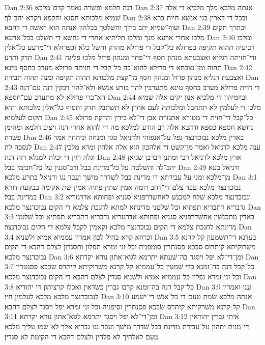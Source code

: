 Dan 2:36  דנה חלמא ופשׁרה נאמר קדם־מלכא׃
Dan 2:37  אנתה מלכא מלך מלכיא די אלה שׁמיא מלכותא חסנא ותקפא ויקרא יהב־לך׃
Dan 2:38  ובכל־די דארין בני־אנשׁא חיות ברא ועוף־שׁמיא יהב בידך והשׁלטך בכלהון אנתה הוא ראשׁה די דהבא׃
Dan 2:39  ובתרך תקום מלכו אחרי ארעא מנך ומלכו תליתיא אחרי די נחשׁא די תשׁלט בכל־ארעא׃
Dan 2:40  ומלכו רביעיה תהוא תקיפה כפרזלא כל־קבל די פרזלא מהדק וחשׁל כלא וכפרזלא די־מרעע כל־אלין תדק ותרע׃
Dan 2:41  ודי־חזיתה רגליא ואצבעתא מנהון חסף די־פחר ומנהון פרזל מלכו פליגה תהוה ומן־נצבתא די פרזלא להוא־בה כל־קבל די חזיתה פרזלא מערב בחסף טינא׃
Dan 2:42  ואצבעת רגליא מנהון פרזל ומנהון חסף מן־קצת מלכותא תהוה תקיפה ומנה תהוה תבירה׃
Dan 2:43  די חזית פרזלא מערב בחסף טינא מתערבין להון בזרע אנשׁא ולא־להון דבקין דנה עם־דנה הא־כדי פרזלא לא מתערב עם־חספא׃
Dan 2:44  וביומיהון די מלכיא אנון יקים אלה שׁמיא מלכו די לעלמין לא תתחבל ומלכותה לעם אחרן לא תשׁתבק תדק ותסיף כל־אלין מלכותא והיא תקום לעלמיא׃
Dan 2:45  כל־קבל די־חזית די מטורא אתגזרת אבן די־לא בידין והדקת פרזלא נחשׁא חספא כספא ודהבא אלה רב הודע למלכא מה די להוא אחרי דנה ויציב חלמא ומהימן פשׁרה׃
Dan 2:46  באדין מלכא נבוכדנצר נפל על־אנפוהי ולדניאל סגד ומנחה וניחחין אמר לנסכה לה׃
Dan 2:47  ענה מלכא לדניאל ואמר מן־קשׁט די אלהכון הוא אלה אלהין ומרא מלכין וגלה רזין די יכלת למגלא רזה דנה׃
Dan 2:48  אדין מלכא לדניאל רבי ומתנן רברבן שׂגיאן יהב־לה והשׁלטה על כל־מדינת בבל ורב־סגנין על כל־חכימי בבל׃
Dan 2:49  ודניאל בעא מן־מלכא ומני על עבידתא די מדינת בבל לשׁדרך מישׁך ועבד נגו ודניאל בתרע מלכא׃
Dan 3:1  נבוכדנצר מלכא עבד צלם די־דהב רומה אמין שׁתין פתיה אמין שׁת אקימה בבקעת דורא במדינת בבל׃
Dan 3:2  ונבוכדנצר מלכא שׁלח למכנשׁ לאחשׁדרפניא סגניא ופחותא אדרגזריא גדבריא דתבריא תפתיא וכל שׁלטני מדינתא למתא לחנכת צלמא די הקים נבוכדנצר מלכא׃
Dan 3:3  באדין מתכנשׁין אחשׁדרפניא סגניא ופחותא אדרגזריא גדבריא דתבריא תפתיא וכל שׁלטני מדינתא לחנכת צלמא די הקים נבוכדנצר מלכא וקאמין לקבל צלמא די הקים נבוכדנצר׃
Dan 3:4  וכרוזא קרא בחיל לכון אמרין עממיא אמיא ולשׁניא׃
Dan 3:5  בעדנא די־תשׁמעון קל קרנא משׁרוקיתא קיתרוס סבכא פסנתרין סומפניה וכל זני זמרא תפלון ותסגדון לצלם דהבא די הקים נבוכדנצר מלכא׃
Dan 3:6  ומן־די־לא יפל ויסגד בה־שׁעתא יתרמא לגוא־אתון נורא יקדתא׃
Dan 3:7  כל־קבל דנה בה־זמנא כדי שׁמעין כל־עממיא קל קרנא משׁרוקיתא קיתרס שׂבכא פסנטרין וכל זני זמרא נפלין כל־עממיא אמיא ולשׁניא סגדין לצלם דהבא די הקים נבוכדנצר מלכא׃
Dan 3:8  כל־קבל דנה בה־זמנא קרבו גברין כשׂדאין ואכלו קרציהון די יהודיא׃
Dan 3:9  ענו ואמרין לנבוכדנצר מלכא מלכא לעלמין חיי׃
Dan 3:10  אנתה מלכא שׂמת טעם די כל־אנשׁ די־ישׁמע קל קרנא משׁרקיתא קיתרס שׂבכא פסנתרין וסיפניה וכל זני זמרא יפל ויסגד לצלם דהבא׃
Dan 3:11  ומן־די־לא יפל ויסגד יתרמא לגוא־אתון נורא יקדתא׃
Dan 3:12  איתי גברין יהודאין די־מנית יתהון על־עבידת מדינת בבל שׁדרך מישׁך ועבד נגו גבריא אלך לא־שׂמו עליך מלכא טעם לאלהיך לא פלחין ולצלם דהבא די הקימת לא סגדין׃
